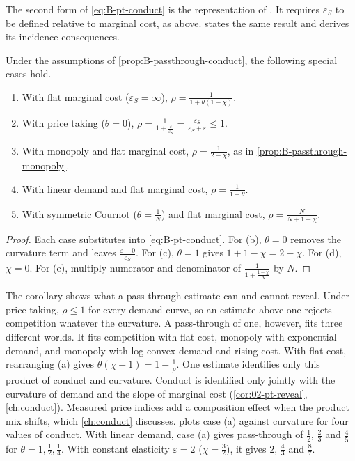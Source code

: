 The second form of \eqref{eq:B-pt-conduct} is the representation of \citet{WeylFabinger2013}. It requires $\varepsilon_S$ to
be defined relative to marginal cost, as above.  states the same result and derives its
incidence consequences.

\begin{corollary}\label{cor:B-passthrough-cases}
Under the assumptions of \cref{prop:B-passthrough-conduct}, the following special cases hold.
\begin{enumerate}[label=(\alph*)]
  \item With flat marginal cost ($\varepsilon_S = \infty$), $\rho = \frac{1}{1 + \theta(1 - \chi)}$.
  \item With price taking ($\theta = 0$), $\rho = \frac{1}{1 + \frac{\varepsilon}{\varepsilon_S}} = \frac{\varepsilon_S}{\varepsilon_S + \varepsilon} \leq 1$.
  \item With monopoly and flat marginal cost, $\rho = \frac{1}{2 - \chi}$, as in \cref{prop:B-passthrough-monopoly}.
  \item With linear demand and flat marginal cost, $\rho = \frac{1}{1 + \theta}$.
  \item With symmetric Cournot ($\theta = \frac{1}{N}$) and flat marginal cost, $\rho = \frac{N}{N + 1 - \chi}$.
\end{enumerate}
\end{corollary}

\begin{proof}
Each case substitutes into \eqref{eq:B-pt-conduct}. For (b), $\theta = 0$ removes the curvature term and leaves
$\frac{\varepsilon - 0}{\varepsilon_S}$. For (c), $\theta = 1$ gives $1 + 1 - \chi = 2 - \chi$. For (d), $\chi = 0$. For (e),
multiply numerator and denominator of $\frac{1}{1 + \frac{1 - \chi}{N}}$ by $N$.
\end{proof}

The corollary shows what a pass-through estimate can and cannot reveal. Under price taking, $\rho \leq 1$ for every
demand curve, so an estimate above one rejects competition whatever the curvature. A pass-through of one, however,
fits three different worlds. It fits competition with flat cost, monopoly with exponential demand, and monopoly with
log-convex demand and rising cost. With flat cost, rearranging (a) gives $\theta(\chi - 1) = 1 - \frac{1}{\rho}$. One
estimate identifies only this product of conduct and curvature. Conduct is identified only jointly with the
curvature of demand and the slope of marginal cost (\cref{cor:02-pt-reveal}, \cref{ch:conduct}). Measured price
indices add a composition effect when the product mix shifts, which \cref{ch:conduct} discusses.
 plots case (a) against curvature for four values of conduct. With linear demand,
case (a) gives pass-through of $\frac{1}{2}$, $\frac{2}{3}$ and $\frac{4}{5}$ for $\theta = 1, \frac{1}{2}, \frac{1}{4}$.
With constant elasticity $\varepsilon = 2$ ($\chi = \frac{3}{2}$), it gives $2$, $\frac{4}{3}$ and $\frac{8}{7}$.

